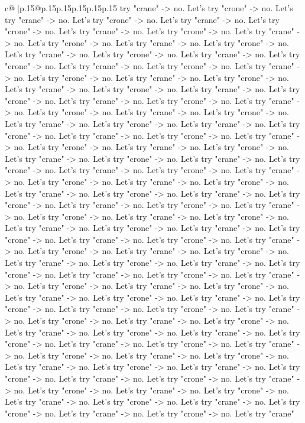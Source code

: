 \documentclass{article}
\begin{document}
{\begin{supertabular}{c@{$\;$}|p{.15\linewidth}@{}p{.15\linewidth}p{.15\linewidth}p{.15\linewidth}p{.15\linewidth}p{.15\linewidth}}
{{{try "crane" {-}> no. Let's try "crone" {-}> no. Let's try "crane" {-}> no. Let's try "crone" {-}> no. Let's try "crane" {-}> no. Let's try "crone" {-}> no. Let's try "crane" {-}> no. Let's try "crone" {-}> no. Let's try "crane" {-}> no. Let's try "crone" {-}> no. Let's try "crane" {-}> no. Let's try "crone" {-}> no. Let's try "crane" {-}> no. Let's try "crone" {-}> no. Let's try "crane" {-}> no. Let's try "crone" {-}> no. Let's try "crane" {-}> no. Let's try "crone" {-}> no. Let's try "crane" {-}> no. Let's try "crone" {-}> no. Let's try "crane" {-}> no. Let's try "crone" {-}> no. Let's try "crane" {-}> no. Let's try "crone" {-}> no. Let's try "crane" {-}> no. Let's try "crone" {-}> no. Let's try "crane" {-}> no. Let's try "crone" {-}> no. Let's try "crane" {-}> no. Let's try "crone" {-}> no. Let's try "crane" {-}> no. Let's try "crone" {-}> no. Let's try "crane" {-}> no. Let's try "crone" {-}> no. Let's try "crane" {-}> no. Let's try "crone" {-}> no. Let's try "crane" {-}> no. Let's try "crone" {-}> no. Let's try "crane" {-}> no. Let's try "crone" {-}> no. Let's try "crane" {-}> no. Let's try "crone" {-}> no. Let's try "crane" {-}> no. Let's try "crone" {-}> no. Let's try "crane" {-}> no. Let's try "crone" {-}> no. Let's try "crane" {-}> no. Let's try "crone" {-}> no. Let's try "crane" {-}> no. Let's try "crone" {-}> no. Let's try "crane" {-}> no. Let's try "crone" {-}> no. Let's try "crane" {-}> no. Let's try "crone" {-}> no. Let's try "crane" {-}> no. Let's try "crone" {-}> no. Let's try "crane" {-}> no. Let's try "crone" {-}> no. Let's try "crane" {-}> no. Let's try "crone" {-}> no. Let's try "crane" {-}> no. Let's try "crone" {-}> no. Let's try "crane" {-}> no. Let's try "crone" {-}> no. Let's try "crane" {-}> no. Let's try "crone" {-}> no. Let's try "crane" {-}> no. Let's try "crone" {-}> no. Let's try "crane" {-}> no. Let's try "crone" {-}> no. Let's try "crane" {-}> no. Let's try "crone" {-}> no. Let's try "crane" {-}> no. Let's try "crone" {-}> no. Let's try "crane" {-}> no. Let's try "crone" {-}> no. Let's try "crane" {-}> no. Let's try "crone" {-}> no. Let's try "crane" {-}> no. Let's try "crone" {-}> no. Let's try "crane" {-}> no. Let's try "crone" {-}> no. Let's try "crane" {-}> no. Let's try "crone" {-}> no. Let's try "crane" {-}> no. Let's try "crone" {-}> no. Let's try "crane" {-}> no. Let's try "crone" {-}> no. Let's try "crane" {-}> no. Let's try "crone" {-}> no. Let's try "crane" {-}> no. Let's try "crone" {-}> no. Let's try "crane" {-}> no. Let's try "crone" {-}> no. Let's try "crane" {-}> no. Let's try "crone" {-}> no. Let's try "crane" {-}> no. Let's try "crone" {-}> no. Let's try "crane" {-}> no. Let's try "crone" {-}> no. Let's try "crane" {-}> no. Let's try "crone" {-}> no. Let's try "crane" {-}> no. Let's try "crone" {-}> no. Let's try "crane" {-}> no. Let's try "crone" {-}> no. Let's try "crane" {-}> no. Let's try "crone" {-}> no. Let's try "crane" {-}> no. Let's try "crone" {-}> no. Let's try "crane" {-}> no. Let's try "crone" {-}> no. Let's try "crane" {-}> no. Let's try "crone" {-}> no. Let's try "crane" {-}> no. Let's try "crone" {-}> no. Let's try "crane" {-}> no. Let's try "crone" {-}> no. Let's try "crane" }}}
\end{supertabular}}
\end{document}
